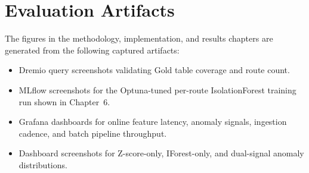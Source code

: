 \section{Evaluation Artifacts}

The figures in the methodology, implementation, and results chapters are
generated from the following captured artifacts:

\begin{itemize}
  \item Dremio query screenshots validating Gold table coverage and route count.
  \item MLflow screenshots for the Optuna-tuned per-route IsolationForest
        training run shown in Chapter~6.
  \item Grafana dashboards for online feature latency, anomaly signals,
        ingestion cadence, and batch pipeline throughput.
  \item Dashboard screenshots for Z-score-only, IForest-only, and dual-signal
        anomaly distributions.
\end{itemize}
